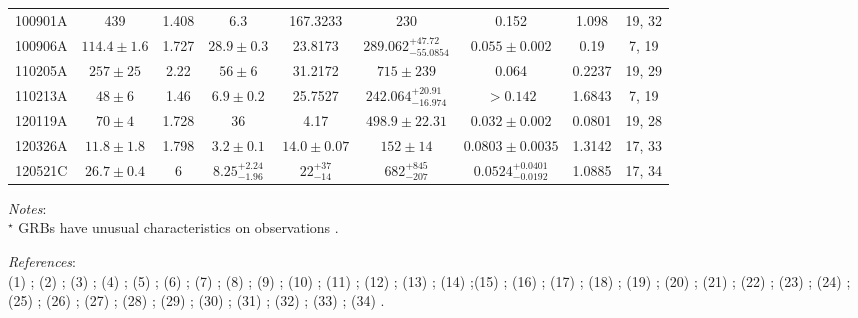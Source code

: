 \documentclass[a4paper,fleqn,usenatbib]{mnras}
\begin{document}
\begin{table*}
\begin{tabular}[width=1.0 \linewidth]{ccccccccc}
\\																																																																					100901A &	439 &	1.408 &	6.3 & 167.3233 &	230	&0.152 &	1.098 &	19, 32 \\																																																																					100906A &	$114.4\pm1.6$ &	1.727 &	$28.9 \pm 0.3$ &	23.8173 &	$289.062_{-55.0854}^{+47.72}$ &	$0.055 \pm 0.002$ &	0.19 &	7, 19 \\																																																																					110205A &	$257 \pm 25$ &	2.22 &	$56 \pm 6$ &	31.2172 &	$715 \pm 239$ &	0.064 &	0.2237 &	19, 29 \\																																																																					110213A &	$48 \pm 6$ &	1.46 &	$6.9 \pm 0.2$ &	25.7527 &	$242.064_{-16.974}^{+20.91}$ &	$>0.142$ &	1.6843 &	7, 19 \\																																																																					120119A &	$70 \pm 4$ &	1.728 &	36 &	4.17 &	$498.9 \pm 22.31$ &	$0.032 \pm 0.002$ &	0.0801 &	19, 28 \\																																																																					120326A &  	$11.8 \pm 1.8$ &	1.798 &	$3.2\pm0.1$ &	$14.0 \pm 0.07$ &	$152\pm14$ &	$0.0803\pm0.0035$ &	1.3142 &	17, 33 \\																																																																					120521C  &	$26.7\pm0.4$ &	6 &	$8.25_{-1.96}^{+2.24}$ &	$22_{-14}^{+37}$ & $682_{-207}^{+845}$ &	$0.0524_{-0.0192}^{+0.0401}$ &	1.0885 &	17, 34 \\
\hline																																																																			\end{tabular}
\begin{minipage}{16cm}
\emph{Notes}: \\
$^{\star}$ GRBs have unusual characteristics on observations \citep[]{Xin2011,Zhang2009}.

\emph{References}: \\
(1) \citealt{Liu2015a}; (2) \citealt{Butler2007}; (3) \citealt{Zhang2011}; (4) \citealt{Ryan2015}; (5) \citealt{Racusin2009}; (6) \citealt{Kann2011} ; (7) \citealt{Zhang2012}; (8) \citealt{Antonelli2009}; (9) \citealt{Tsutsui2013}; (10) \citealt{Zaninoni2016}; (11) \citealt{Berger2013b}; (12) \citealt{Cummings2013}; (13) \citealt{Sakamoto2014}; (14) \citealt{Stanbro2016} ;(15) \citealt{Lv2017}; (16) \citealt{Amati2008}; (17) \citealt{Song2016}; (18) \citealt{Nemmen2012}; (19) \citealt{Yi2016}; (20) \citealt{Zhang2007b}; (21) \citealt{Kann2010}; (22) \citealt{Xu2009}; (23) \citealt{Ofek2007}; (24) \citealt{Guidorzi2009}; (25) \citealt{Amati2009}; (26) \citealt{Guidorzi2011}; (27) \citealt{Kruhler2009}; (28) \citealt{Dichiara2016}; (29) \citealt{Ghirlanda2012}; (30) \citealt{Marshall2011}; (31) \citealt{Laskar2015};
  (32) \citealt{Gorbovskoy2012}; (33) \citealt{Demianski2017}; (34) \citealt{Yasuda2017}.\\
\end{minipage}
\end{table*}
\end{document}
